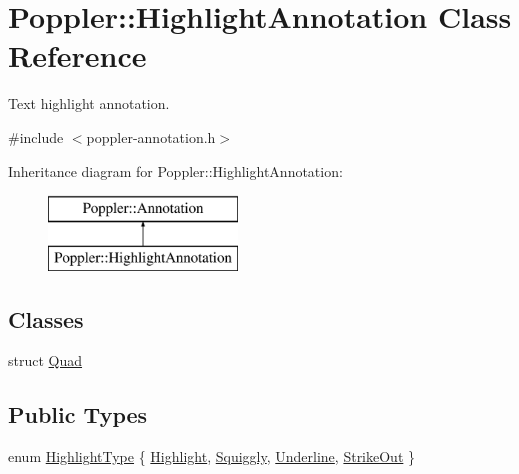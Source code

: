 \hypertarget{class_poppler_1_1_highlight_annotation}{}\section{Poppler\+:\+:Highlight\+Annotation Class Reference}
\label{class_poppler_1_1_highlight_annotation}


Text highlight annotation.  




{\ttfamily \#include $<$poppler-\/annotation.\+h$>$}

Inheritance diagram for Poppler\+:\+:Highlight\+Annotation\+:\begin{figure}[H]
\begin{center}
\leavevmode
\includegraphics[height=2.000000cm]{class_poppler_1_1_highlight_annotation}
\end{center}
\end{figure}
\subsection*{Classes}
\begin{DoxyCompactItemize}
\item 
struct \hyperlink{struct_poppler_1_1_highlight_annotation_1_1_quad}{Quad}
\end{DoxyCompactItemize}
\subsection*{Public Types}
\begin{DoxyCompactItemize}
\item 
enum \hyperlink{class_poppler_1_1_highlight_annotation_ae605e74038eb2a3810a789377524f2a0}{Highlight\+Type} \{ \hyperlink{class_poppler_1_1_highlight_annotation_ae605e74038eb2a3810a789377524f2a0ad361cb7e0e2851afc703a8394bb4a1d0}{Highlight}, 
\hyperlink{class_poppler_1_1_highlight_annotation_ae605e74038eb2a3810a789377524f2a0a37d1086c08ea82fcc684fa03e7ab5dcc}{Squiggly}, 
\hyperlink{class_poppler_1_1_highlight_annotation_ae605e74038eb2a3810a789377524f2a0a529d5dd89e2abe0f5d400c94e4e8c42b}{Underline}, 
\hyperlink{class_poppler_1_1_highlight_annotation_ae605e74038eb2a3810a789377524f2a0a5d34b879bbf2e557da55afb4c0b7eebd}{Strike\+Out}
 \}
\end{DoxyCompactItemize}
